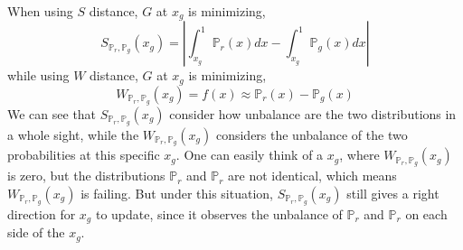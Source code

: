 \documentclass[letterpaper]{article} %
\begin{document}
When using $S$ distance, $G$ at $x_g$ is minimizing,
\begin{equation}\label{s-distance-at-xg}
  S_{\mathbb{P}_r,\mathbb{P}_g}(x_g)= | \int_{x_g}^{1} \mathbb{P}_r(x) d x - \int_{x_g}^{1} \mathbb{P}_g(x) d x |
\end{equation}
while using $W$ distance, $G$ at $x_g$ is minimizing,
\begin{equation}\label{w-distance-xg}
  W_{\mathbb{P}_r,\mathbb{P}_g}(x_g) = f(x) \approx \mathbb{P}_r(x) - \mathbb{P}_g(x)
\end{equation}
We can see that $S_{\mathbb{P}_r,\mathbb{P}_g}(x_g)$ consider how unbalance are the two distributions in a whole sight, while the $W_{\mathbb{P}_r,\mathbb{P}_g}(x_g)$ considers the unbalance of the two probabilities at this specific $x_g$. One can easily think of a $x_g$, where $W_{\mathbb{P}_r,\mathbb{P}_g}(x_g)$ is zero, but the distributions $\mathbb{P}_r$ and $\mathbb{P}_r$ are not identical, which means $W_{\mathbb{P}_r,\mathbb{P}_g}(x_g)$ is failing. But under this situation, $S_{\mathbb{P}_r,\mathbb{P}_g}(x_g)$ still gives a right direction for $x_g$ to update, since it observes the unbalance of $\mathbb{P}_r$ and $\mathbb{P}_r$ on each side of the $x_g$.
\end{document}
